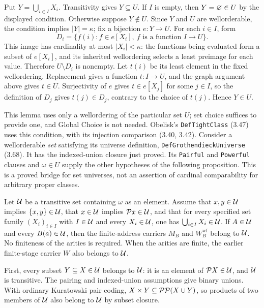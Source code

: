 Put $Y=\bigcup_{i\in I}X_i$. Transitivity gives $Y\subseteq U$.
If $I$ is empty, then $Y=\varnothing\in U$ by the displayed condition.
Otherwise suppose $Y\notin U$. Since $Y$ and $U$ are wellorderable,
the condition implies $|Y|=\kappa$; fix a bijection $e:Y\to U$.
For each $i\in I$, form
\[
D_i=\{f(i):f\in e[X_i],\ f\text{ is a function }I\to U\}.
\]
This image has cardinality at most $|X_i|<\kappa$: the functions
being evaluated form a subset of $e[X_i]$, and its inherited
wellordering selects a least preimage for each value. Therefore
$U\setminus D_i$ is nonempty. Let $t(i)$ be its least element in the
fixed wellordering. Replacement gives a function $t:I\to U$, and
the graph argument above gives $t\in U$. Surjectivity of $e$ gives
$t\in e[X_j]$ for some $j\in I$, so the definition of $D_j$ gives
$t(j)\in D_j$, contrary to the choice of $t(j)$. Hence $Y\in U$.
\Done

This lemma uses only a wellordering of the particular set $U$; set
choice suffices to provide one, and Global Choice is not needed.
Obelisk's \texttt{DefTightClass} (3.47) uses this condition, with its
injection comparison (3.40, 3.42). Consider a wellorderable \emph{set}
satisfying its universe definition, \texttt{DefGrothendieckUniverse}
(3.68). It has the indexed-union closure just proved.
Its \texttt{Pairful} and \texttt{Powerful} clauses and $\omega\in U$
supply the other hypotheses of the following proposition. This is a
proved bridge for set universes, not an assertion of cardinal
comparability for arbitrary proper classes.

\begin{proposition}
\label{prop:WM_universe_closure}
Let $\mathcal{U}$ be a transitive set containing $\omega$ as an element. Assume
that $x,y\in\mathcal{U}$ implies $\{x,y\}\in\mathcal{U}$, that $x\in\mathcal{U}$ implies
$\mathcal{P} x\in\mathcal{U}$, and that for every specified set family
$(X_i)_{i\in I}$ with $I\in\mathcal{U}$ and every $X_i\in\mathcal{U}$, one has
$\bigcup_{i\in I}X_i\in\mathcal{U}$. If $A\in\mathcal{U}$ and every $B(a)\in\mathcal{U}$,
then the finite-address carriers $M_B$ and $W_B^{\mathrm{wf}}$ belong
to $\mathcal{U}$. No finiteness of the arities is required. When the arities
are finite, the earlier finite-stage carrier $W$ also belongs to $\mathcal{U}$.
\end{proposition}
\Proof
First, every subset $Y\subseteq X\in\mathcal{U}$ belongs to $\mathcal{U}$: it is an
element of $\mathcal{P} X\in\mathcal{U}$, and $\mathcal{U}$ is transitive. The pairing and
indexed-union assumptions give binary unions. With ordinary Kuratowski
pair coding, $X\times Y\subseteq\mathcal{P}\mathcal{P}(X\cup Y)$, so products
of two members of $\mathcal{U}$ also belong to $\mathcal{U}$ by subset closure.

